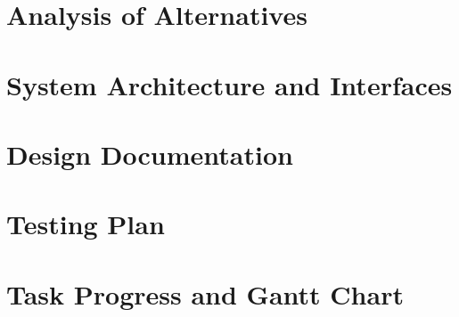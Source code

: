 \documentclass[12pt]{article}
\begin{document}
\section{Analysis of Alternatives}
\section{System Architecture and Interfaces}
\section{Design Documentation}
\section{Testing Plan}
\section{Task Progress and Gantt Chart}
\end{document}
